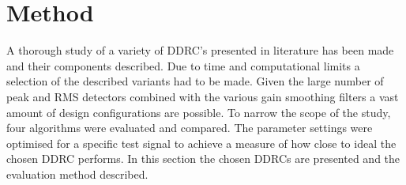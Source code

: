 \documentclass[../main2.tex]{subfiles}
\providecommand{\rootdir}{..}
\begin{document}
\section{Method}\label{method}
A thorough study of a variety of DDRC's presented in literature has been made and their components described. Due to time and computational limits a selection of the described variants had to be made. Given the large number of peak and RMS detectors combined with the various gain smoothing filters a vast amount of design configurations are possible. To narrow the scope of the study, four algorithms were evaluated and compared. The parameter settings were optimised for a specific test signal to achieve a measure of how close to ideal the chosen DDRC performs.  In this section the chosen DDRCs are presented and the evaluation method described.








\end{document}
